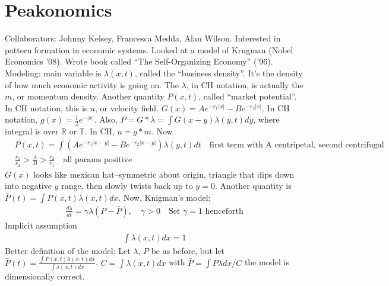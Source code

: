 \documentclass[12pt,reqno]{amsart}
\numberwithin{equation}{section}  %
\newcommand{\rr}{\mathbb{R}}
\newcommand{\ci}{\mathbb{T}}
\begin{document}
\section{Peakonomics} 
\label{sec:peakonomics}
Collaborators: Johnny Kelsey, Francesca Medda, Alan Wilson. Interested in
pattern formation in economic systems. Looked at a model of Krugman (Nobel
Economics '08). Wrote book called ``The Self-Organizing Economy'' ('96).
Modeling: main variable is $\lambda (x,t)$, called the ``business density''.
It's the density of how much economic activity is going on. 
%
%
The $\lambda$, in CH notation,
is actually the $m$, or momentum density. Another quantity
$P(x,t)$, called ``market potential''. In CH notation, this is $u$, or velocity
field. $G(x) = Ae^{-r_{1} | x |} - Be^{-r_{2}| x |}$. In CH notation,
$g(x) = \frac{1}{2}e^{-| x |}$. Also, $P = G* \lambda = \int G(x-y) \lambda
(y,t) dy$, where integral is over $\rr$ or $\ci$. In CH, $u = g*m$.
Now %
%
\begin{equation*}
    \begin{split}
	& P(x,t) = \int \left( A e^{-r_{1}| x-y |} - Be^{-r_{2}| x-y |}  \right)
	\lambda(y,t) dt \quad \text{first term with A centripetal, second centrifugal}
	\\
	& \frac{r_{1}}{r_{2}} > \frac{A}{B} > \frac{r_{2}}{r_{1}} \quad \text{all
	    params positive}
    \end{split}
\end{equation*}
%
%
$G(x)$ looks like mexican hat--symmetric about origin, triangle that dips down
into negative $y$ range, then slowly twists back up to $y=0$. Another quantity
is $\bar{P}(t) = \int P(x,t) \lambda(x,t) dx$. Now, Knigman's model:
%
%
\begin{equation*}
    \begin{split}
	\frac{d \lambda}{dt} = \gamma \lambda (P - \bar{P}), \quad \gamma >0 \quad
	\text{Set $\gamma=1$ henceforth}
    \end{split}
\end{equation*}
%
%
Implicit assumption
%
%
\begin{equation*}
    \begin{split}
	\int \lambda(x,t)dx=1
    \end{split}
\end{equation*}
%
%
Better definition of the model: Let $\lambda$, $P$ be as before, but let
$\bar{P}(t) = \frac{\int P(x,t) \lambda(x,t)dx}{\int \lambda(x,t)dx}$.
$C = \int \lambda(x,t) dx$ with $\bar{P} = \int P \lambda dx / C$ the model is
dimensionally correct.
%
%
%
%
\end{document}
